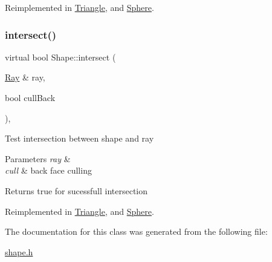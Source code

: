 Reimplemented in \mbox{\hyperlink{class_triangle_ad78a148da18386f99f23731ce7de431f}{Triangle}}, and \mbox{\hyperlink{class_sphere_ab4700cd65d2bba22863d0bee673e8bf3}{Sphere}}.

\mbox{\label{class_shape_a41cb78dcc1b919cdba2b7fbc0a1a0bc8}} 
\subsubsection{\texorpdfstring{intersect()}{intersect()}\hspace{0.1cm}{\footnotesize\ttfamily [2/2]}}
{\footnotesize\ttfamily virtual bool Shape\+::intersect (\begin{DoxyParamCaption}\item[{\mbox{\hyperlink{class_ray}{Ray}} \&}]{ray,  }\item[{bool}]{cull\+Back }\end{DoxyParamCaption})\hspace{0.3cm}{\ttfamily [inline]}, {\ttfamily [virtual]}}

Test intersection between shape and ray 
\begin{DoxyParams}{Parameters}
{\em ray} & \\
\hline
{\em cull} & back face culling \\
\hline
\end{DoxyParams}
\begin{DoxyReturn}{Returns}
true for sucessfull intersection 
\end{DoxyReturn}


Reimplemented in \mbox{\hyperlink{class_triangle_abf8edc617d32e7c651a01efc0cb4647e}{Triangle}}, and \mbox{\hyperlink{class_sphere_a0ca2b62d692108272b9b64857965838b}{Sphere}}.



The documentation for this class was generated from the following file\+:\begin{DoxyCompactItemize}
\item 
\mbox{\hyperlink{shape_8h}{shape.\+h}}\end{DoxyCompactItemize}
